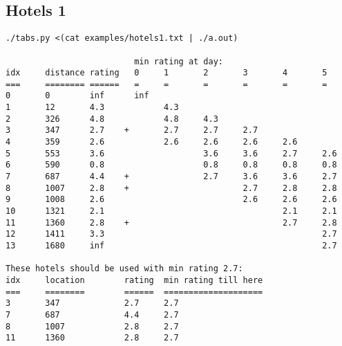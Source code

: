 \documentclass[a4paper,10pt,ngerman]{scrartcl}
\begin{document}
\subsection*{Hotels 1}
\begin{lstlisting}
./tabs.py <(cat examples/hotels1.txt | ./a.out)

                          min rating at day:
idx     distance rating   0     1       2       3       4       5
===     ======== ======   =     =       =       =       =       =
0       0        inf      inf
1       12       4.3            4.3
2       326      4.8            4.8     4.3
3       347      2.7    +       2.7     2.7     2.7
4       359      2.6            2.6     2.6     2.6     2.6
5       553      3.6                    3.6     3.6     2.7     2.6
6       590      0.8                    0.8     0.8     0.8     0.8
7       687      4.4    +               2.7     3.6     3.6     2.7
8       1007     2.8    +                       2.7     2.8     2.8
9       1008     2.6                            2.6     2.6     2.6
10      1321     2.1                                    2.1     2.1
11      1360     2.8    +                               2.7     2.8
12      1411     3.3                                            2.7
13      1680     inf                                            2.7

These hotels should be used with min rating 2.7:
idx     location        rating  min rating till here
===     ========        ======  ====================
3       347             2.7     2.7
7       687             4.4     2.7
8       1007            2.8     2.7
11      1360            2.8     2.7
\end{lstlisting}
\end{document}
